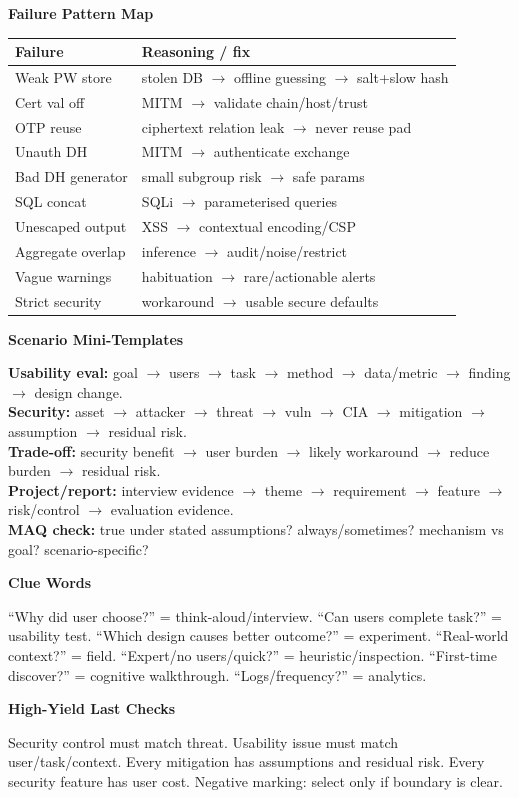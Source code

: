 \documentclass[8pt]{extarticle}
\newcommand{\h}[1]{\vspace{1pt}\textbf{#1}\par}
\begin{document}
\begin{multicols*}{5}
\h{Failure Pattern Map}
\begin{tabularx}{\linewidth}{@{}lY@{}}
\toprule
Failure & Reasoning / fix\\ \midrule
Weak PW store & stolen DB $\to$ offline guessing $\to$ salt+slow hash\\
Cert val off & MITM $\to$ validate chain/host/trust\\
OTP reuse & ciphertext relation leak $\to$ never reuse pad\\
Unauth DH & MITM $\to$ authenticate exchange\\
Bad DH generator & small subgroup risk $\to$ safe params\\
SQL concat & SQLi $\to$ parameterised queries\\
Unescaped output & XSS $\to$ contextual encoding/CSP\\
Aggregate overlap & inference $\to$ audit/noise/restrict\\
Vague warnings & habituation $\to$ rare/actionable alerts\\
Strict security & workaround $\to$ usable secure defaults\\
\bottomrule
\end{tabularx}

\h{Scenario Mini-Templates}
\textbf{Usability eval:} goal $\to$ users $\to$ task $\to$ method $\to$ data/metric $\to$ finding $\to$ design change.\\
\textbf{Security:} asset $\to$ attacker $\to$ threat $\to$ vuln $\to$ CIA $\to$ mitigation $\to$ assumption $\to$ residual risk.\\
\textbf{Trade-off:} security benefit $\to$ user burden $\to$ likely workaround $\to$ reduce burden $\to$ residual risk.\\
\textbf{Project/report:} interview evidence $\to$ theme $\to$ requirement $\to$ feature $\to$ risk/control $\to$ evaluation evidence.\\
\textbf{MAQ check:} true under stated assumptions? always/sometimes? mechanism vs goal? scenario-specific?

\h{Clue Words}
``Why did user choose?'' = think-aloud/interview. ``Can users complete task?'' = usability test. ``Which design causes better outcome?'' = experiment. ``Real-world context?'' = field. ``Expert/no users/quick?'' = heuristic/inspection. ``First-time discover?'' = cognitive walkthrough. ``Logs/frequency?'' = analytics.

\h{High-Yield Last Checks}
Security control must match threat. Usability issue must match user/task/context. Every mitigation has assumptions and residual risk. Every security feature has user cost. Negative marking: select only if boundary is clear.

\end{multicols*}
\end{document}
